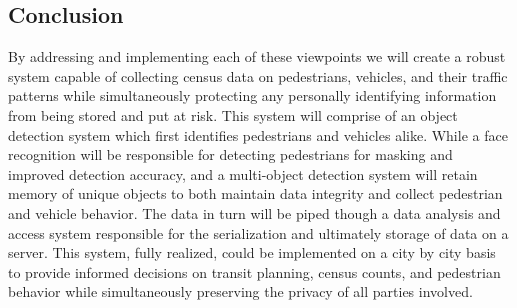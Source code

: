 \subsection{Conclusion}

By addressing and implementing each of these viewpoints we will create a robust system capable of collecting census data on pedestrians, vehicles, and their traffic patterns while simultaneously protecting any personally identifying information from being stored and put at risk. This system will comprise of an object detection system which first identifies pedestrians and vehicles alike. While a face recognition will be responsible for detecting pedestrians for masking and improved detection accuracy, and a multi-object detection system will retain memory of unique objects to both maintain data integrity and collect pedestrian and vehicle behavior. The data in turn will be piped though a data analysis and access system responsible for the serialization and ultimately storage of data on a server. This system, fully realized, could be implemented on a city by city basis to provide informed decisions on transit planning, census counts, and pedestrian behavior while simultaneously preserving the privacy of all parties involved.